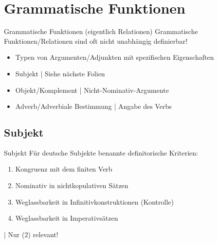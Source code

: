 \section{Grammatische Funktionen}

\begin{frame}
  {Grammatische Funktionen (eigentlich Relationen)}
  \onslide<+->
  \onslide<+->
  Grammatische Funktionen\slash Relationen sind oft nicht unabhängig definierbar!\\
  \Zeile
  \begin{itemize}[<+->]
    \item Typen von Argumenten\slash Adjunkten mit spezifischen Eigenschaften
      \Halbzeile
    \item \alert{Subjekt} | Siehe nächste Folien
    \item \alert{Objekt}\slash \alert{Komplement} | Nicht-Nominativ-Argumente
    \item \alert{Adverb}\slash \alert{Adverbiale Bestimmung} | Angabe des Verbs
  \end{itemize}
\end{frame}

\subsection{Subjekt}

\begin{frame}
  {Subjekt}
  \onslide<+->
  \onslide<+->
  Für \alert{deutsche Subjekte} benannte definitorische Kriterien:\\
  \Halbzeile
  \begin{enumerate}[<+->]
    \item \alert{Kongruenz} mit dem finiten Verb
    \item \alert{Nominativ} in nichtkopulativen Sätzen
    \item Weglassbarkeit in \alert{Infinitivkonstruktionen} (Kontrolle)
    \item Weglassbarkeit in \alert{Imperativsätzen}
  \end{enumerate}
  \Zeile
  \onslide<+->
  \citet{Reis82} | Nur (2) relevant!
\end{frame}


